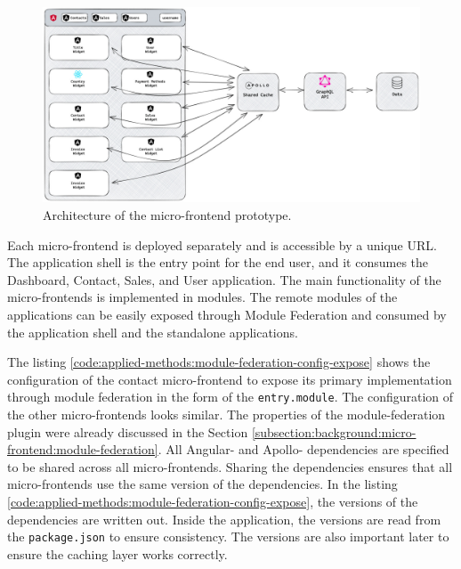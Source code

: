 \ifshowImages
\begin{figure}[H]
    \centering
    \includegraphics[width=1\linewidth]{images/applied-methods/prototypical-implementation/host-architecture.jpg}
    \caption{Architecture of the micro-frontend prototype.}\label{fig:applied-methods:prototype-micro-frontend-architecture}
\end{figure}
\fi

\noindent Each micro-frontend is deployed separately and is accessible by a unique \ac{URL}. The application shell is the entry point for the end user, and it consumes the Dashboard, Contact, Sales, and User application. The main functionality of the micro-frontends is implemented in modules. The remote modules of the applications can be easily exposed through Module Federation and consumed by the application shell and the standalone applications.

\bigskip

\noindent The listing \ref{code:applied-methods:module-federation-config-expose} shows the configuration of the contact micro-frontend to expose its primary implementation through module federation in the form of the \texttt{entry.module}. The configuration of the other micro-frontends looks similar. The properties of the module-federation plugin were already discussed in the Section \ref{subsection:background:micro-frontend:module-federation}. All Angular- and Apollo- dependencies are specified to be shared across all micro-frontends. Sharing the dependencies ensures that all micro-frontends use the same version of the dependencies. In the listing \ref{code:applied-methods:module-federation-config-expose}, the versions of the dependencies are written out. Inside the application, the versions are read from the \texttt{package.json} to ensure consistency. The versions are also important later to ensure the caching layer works correctly.

